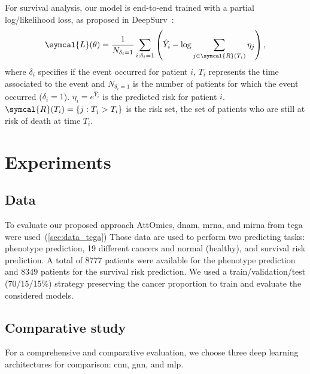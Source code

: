 \documentclass[../main.tex]{subfiles}
\begin{document}
		For survival analysis, our model is end-to-end trained with a partial log\-/likelihood loss, as proposed in DeepSurv~\cite{katzmanDeepSurvPersonalizedTreatment2018}:
		\[ \symcal{L}(\theta) = \frac{1}{N_{\delta_i = 1}} \sum_{i:\delta_i=1} \left(\hat{Y}_i - \log \sum_{j \in \symcal{R}(T_i)}\eta_j \right) \text{,}\]
		where \(\delta_i\) specifies if the event occurred for patient \(i\), \(T_i\) represents the time associated to the event and \(N_{\delta_i = 1}\) is the number of patients for which the event occurred (\(\delta_i = 1\)).
		\(\eta_i = e^{\hat{Y}_i}\) is the predicted risk for patient \(i\).
		\(\symcal{R}(T_i) = \{j: T_j > T_i\}\) is the risk set, the set of patients who are still at risk of death at time \(T_i\).

\section{Experiments}
	\subsection{Data}
		To evaluate our proposed approach AttOmics, \gls{dnam}, \gls{mrna}, and \gls{mirna} from \gls{tcga} were used~(\cref{sec:data_tcga})
		Those data are used to perform two predicting tasks: phenotype prediction, 19 different cancers and normal (healthy), and survival risk prediction.
		A total of 8777 patients were available for the phenotype prediction and 8349 patients for the survival risk prediction.
		We used a train/validation/test (70/15/15\%) strategy preserving the cancer proportion to train and evaluate the considered models.

	\subsection{Comparative study}
		For a comprehensive and comparative evaluation, we choose three deep learning architectures for comparison: \gls{cnn}, \gls{gnn}, and \gls{mlp}.
\end{document}
